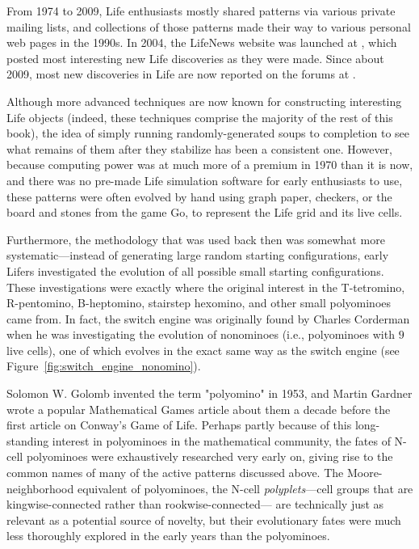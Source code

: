 From 1974 to 2009, Life enthusiasts mostly shared patterns via various private mailing lists, and collections of those patterns made their way to various personal web pages in the 1990s. In 2004, the LifeNews website was launched at , which posted most interesting new Life discoveries as they were made. Since about 2009, most new discoveries in Life are now reported on the forums at .

Although more advanced techniques are now known for constructing interesting Life objects (indeed, these techniques comprise the majority of the rest of this book), the idea of simply running randomly-generated soups to completion to see what remains of them after they stabilize has been a consistent one. However, because computing power was at much more of a premium in 1970 than it is now, and there was no pre-made Life simulation software for early enthusiasts to use, these patterns were often evolved by hand using graph paper, checkers, or the board and stones from the game Go, to represent the Life grid and its live cells.

Furthermore, the methodology that was used back then was somewhat more systematic---instead of generating large random starting configurations, early Lifers investigated the evolution of all possible small starting configurations. These investigations were exactly where the original interest in the T-tetromino, R-pentomino, B-heptomino, stairstep hexomino, and other small polyominoes came from. In fact, the switch engine was originally found by Charles Corderman when he was investigating the evolution of nonominoes (i.e., polyominoes with $9$ live cells), one of which evolves in the exact same way as the switch engine (see Figure~\ref{fig:switch_engine_nonomino}).

Solomon W. Golomb invented the term "polyomino" in 1953, and Martin Gardner wrote a popular Mathematical Games article about them a decade before the first article on Conway's Game of Life. Perhaps partly because of this long-standing interest in polyominoes in the mathematical community, the fates of N-cell polyominoes were exhaustively researched very early on, giving rise to the common names of many of the active patterns discussed above.  The Moore-neighborhood equivalent of polyominoes, the N-cell \emph{polyplets}---cell groups that are kingwise-connected rather than rookwise-connected--- are technically just as relevant as a potential source of novelty, but their evolutionary fates were much less thoroughly explored in the early years than the polyominoes.

